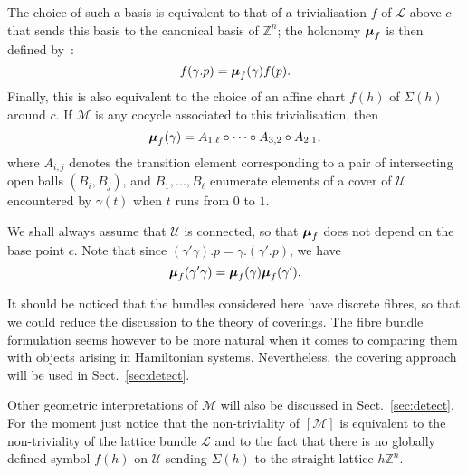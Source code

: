 \documentclass[cmp]{svjour}  %
\newcommand{\ZM}{\mathbb{Z}}
\newcommand{\U}{\mathcal{U}}
\newcommand{\M}{\mathcal{M}}
\renewcommand{\L}{\mathcal{L}}
\newcommand{\bmu}{\mbox{\boldmath{$\mu$}}}
\begin{document}
The choice of such a basis is equivalent to that of a trivialisation
$f$ of $\L$ above $c$ that sends this basis to the canonical basis of
$\ZM^n$; the holonomy $\bmu_f$ is then defined by~:
\begin{equation}
        \label{equ:holonomy}
        f(\gamma.p) = \bmu_f(\gamma)f(p).
\end{equation}
Finally, this is also equivalent to the choice of an affine chart
$f(h)$ of $\Sigma(h)$ around $c$.
If $\M$ is any cocycle associated to this
trivialisation, then
\begin{equation}
  \label{equ:integral}
  \bmu_{f}(\gamma) = A_{1,\ell}\circ\cdots\circ A_{3,2}\circ A_{2,1},
\end{equation}
where $A_{i,j}$ denotes the transition element corresponding to a
pair of intersecting open balls $(B_i,B_j)$, and $B_1,\dots,B_\ell$
enumerate elements of a cover of $\U$ encountered by $\gamma(t)$ when
$t$ runs from $0$ to $1$.

We shall always assume that $\U$ is connected, so that $\bmu_f$ does
not depend on the base point $c$. Note that since
$(\gamma'\gamma).p=\gamma.(\gamma'.p)$, we have
\[ \bmu_f(\gamma'\gamma) = \bmu_f(\gamma)\bmu_f(\gamma').\]


It should be noticed that the bundles considered here have discrete
fibres, so that we could reduce the discussion to the theory of
coverings. The fibre bundle formulation seems however to be more
natural when it comes to comparing them with objects arising in
Hamiltonian systems. Nevertheless, the covering approach will be used
in Sect.~\ref{sec:detect}.

Other geometric interpretations of $\M$ will also be discussed in
Sect.~\ref{sec:detect}. For the moment just notice that the
non-triviality of $[\M]$ is equivalent to the non-triviality of the
lattice bundle $\L$ and to the fact that there is no globally defined
symbol $f(h)$ on $\U$ sending $\Sigma(h)$ to the straight lattice
$h\ZM^n$.
\end{document}
